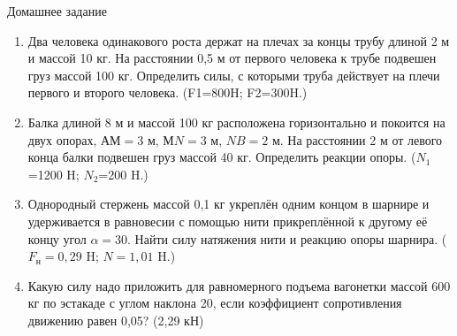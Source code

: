 \documentclass[a6paper, 11pt]{diss_4}
\renewcommand{\'}{\,'}
\begin{document}
\begin{center}
   Домашнее задание
\end{center}
\begin{enumerate}

\item Два человека одинакового роста держат на плечах за концы трубу длиной 2 м и массой 10 кг. На расстоянии 0,5 м от первого человека к трубе подвешен груз массой 100 кг. Определить силы, с которыми труба действует на плечи первого и второго человека. (F1=800H; F2=300H.)

\item Балка длиной 8 м и массой 100 кг расположена горизонтально и покоится на двух опорах, $АМ=3$ м, $МN=3$ м, $NB=2$ м. На расстоянии 2 м от левого конца балки подвешен груз массой 40 кг. Определить реакции опоры. ($N_1$=1200 H; $N_2$=200 H.)

\item Однородный стержень массой 0,1 кг укреплён одним концом в шарнире и удерживается в равновесии с помощью нити прикреплённой к другому её концу угол $\alpha=30$\textdegree. Найти силу натяжения нити и реакцию опоры шарнира. ($F_н=0,29$ H; $N=1,01$ H.)

\item Какую силу надо приложить для равномерного подъема вагонетки массой 600 кг по эстакаде с углом наклона 20\textdegree, если коэффициент сопротивления движению равен 0,05? (2,29 кН)

\end{enumerate}
\end{document}
